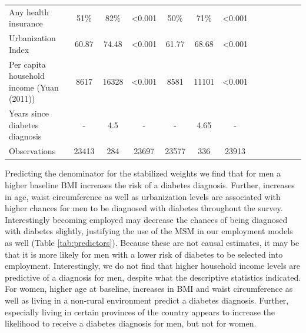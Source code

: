 \begin{landscape}
\begin{table}[h]
\begin{center}
\begin{adjustbox}{max width=\linewidth}
{\begin{tabular}{l*{6}{SS}}
Any health insurance&        51\%&     82\%&     <0.001       &        50\%&        71\%&       <0.001      \\
Urbanization Index  &       60.87&     74.48&     <0.001       &       61.77&       68.68&     <0.001       \\
Per capita household income (Yuan (2011))&    8617&     16328&    <0.001        &     8581&     11101&    <0.001        \\
Years since diabetes diagnosis&       -&        4.5&      -      &        -&        4.65&      -      \\
\midrule
Observations        &       23413&         284&       23697&       23577&         336&       23913     \\
\bottomrule
\end{tabular}
}
\end{adjustbox}
\end{center}
\end{table}
\end{landscape}
\FloatBarrier

Predicting the denominator for the stabilized weights we find that for men a higher baseline \ac{BMI} increases the risk of a diabetes diagnosis. Further, increases in age, waist circumference as well as urbanization levels are associated with higher chances for men to be diagnosed with diabetes throughout the survey. Interestingly becoming employed may decrease the chances of being diagnosed with diabetes slightly, justifying the use of the \ac{MSM} in our employment models as well  (Table \ref{tab:predictors}). Because these are not causal estimates, it may be that it is more likely for men with a lower risk of diabetes to be selected into employment. Interestingly, we do not find that higher household income levels are predictive of a diagnosis for men, despite what the descriptive statistics indicated. For women, higher age at baseline, increases in \ac{BMI} and waist circumference  as well as living in a non-rural environment predict a diabetes diagnosis. Further, especially living in certain provinces of the country appears to increase the likelihood to receive a diabetes diagnosis for men, but not for women.

